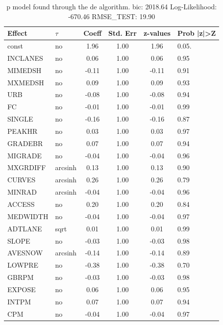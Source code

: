 \begin{table}
	\caption{p model found through the de algorithm. bic: 2018.64 Log-Likelihood: -670.46 RMSE_TEST: 19.90}
	\begin{center}
		\begin{tabular}{|l|l|c|c|c|l|}
			\hline
			Effect & $\tau$ & Coeff & Std. Err & z-values & Prob |z|>Z \\
			\hline
			const & no & 1.96 & 1.00 & 1.96 & 0.05. \\
			\hline
			INCLANES & no & 0.06 & 1.00 & 0.06 & 0.95 \\
			\hline
			MIMEDSH & no & -0.11 & 1.00 & -0.11 & 0.91 \\
			\hline
			MXMEDSH & no & 0.09 & 1.00 & 0.09 & 0.93 \\
			\hline
			URB & no & -0.08 & 1.00 & -0.08 & 0.94 \\
			\hline
			FC & no & -0.01 & 1.00 & -0.01 & 0.99 \\
			\hline
			SINGLE & no & -0.16 & 1.00 & -0.16 & 0.87 \\
			\hline
			PEAKHR & no & 0.03 & 1.00 & 0.03 & 0.97 \\
			\hline
			GRADEBR & no & 0.07 & 1.00 & 0.07 & 0.94 \\
			\hline
			MIGRADE & no & -0.04 & 1.00 & -0.04 & 0.96 \\
			\hline
			MXGRDIFF & arcsinh & 0.13 & 1.00 & 0.13 & 0.90 \\
			\hline
			CURVES & arcsinh & 0.26 & 1.00 & 0.26 & 0.79 \\
			\hline
			MINRAD & arcsinh & -0.04 & 1.00 & -0.04 & 0.96 \\
			\hline
			ACCESS & no & 0.20 & 1.00 & 0.20 & 0.84 \\
			\hline
			MEDWIDTH & no & -0.04 & 1.00 & -0.04 & 0.97 \\
			\hline
			ADTLANE & sqrt & 0.01 & 1.00 & 0.01 & 0.99 \\
			\hline
			SLOPE & no & -0.03 & 1.00 & -0.03 & 0.98 \\
			\hline
			AVESNOW & arcsinh & -0.14 & 1.00 & -0.14 & 0.89 \\
			\hline
			LOWPRE & no & -0.38 & 1.00 & -0.38 & 0.70 \\
			\hline
			GBRPM & no & -0.03 & 1.00 & -0.03 & 0.98 \\
			\hline
			EXPOSE & no & 0.06 & 1.00 & 0.06 & 0.95 \\
			\hline
			INTPM & no & 0.07 & 1.00 & 0.07 & 0.94 \\
			\hline
			CPM & no & -0.04 & 1.00 & -0.04 & 0.97 \\

\end{tabular}
\end{center}
\end{table}
